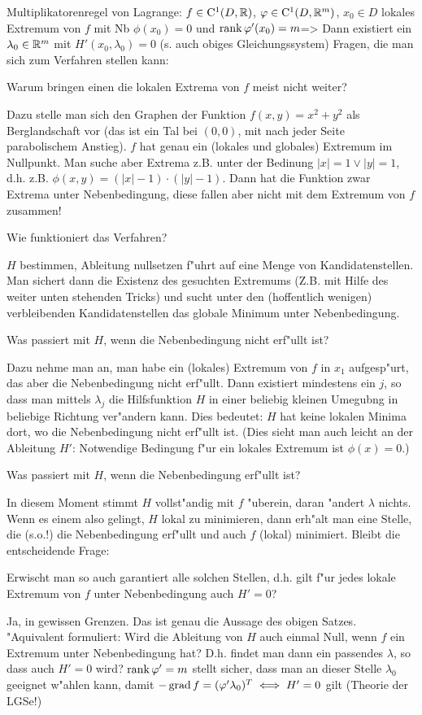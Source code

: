 \theorem Multiplikatorenregel von Lagrange:
  $f\in{\rm C}^1(D,\mathbb R)$, $\varphi\in{\rm C}^1(D,\mathbb R^m)$, 
  $x_0\in D$ lokales Extremum von $f$ mit Nb $\phi(x_0)=0$ und
  $\operatorname{rank} \varphi'(x_0)=m$=>{
  Dann existiert ein $\lambda_0\in\mathbb R^m$ mit $H'(x_0,\lambda_0)=0$ 
  (s. auch obiges Gleichungssystem)
  }
\annotation Fragen, die man sich zum Verfahren stellen kann:{
  Warum bringen einen die lokalen Extrema von $f$ meist nicht weiter?

  Dazu stelle man sich den Graphen der Funktion $f(x,y)=x^2+y^2$ als
  Berglandschaft vor (das ist ein Tal bei $(0,0)$, mit nach jeder
  Seite parabolischem Anstieg). $f$ hat genau ein (lokales und globales)
  Extremum im Nullpunkt. Man suche aber Extrema z.B. unter der Bedinung
  $|x|=1 \lor |y|=1$, d.h. z.B. $\phi(x,y)=(|x|-1)\cdot(|y|-1)$. Dann hat
  die Funktion zwar Extrema unter Nebenbedingung, diese fallen aber
  nicht mit dem Extremum von $f$ zusammen!

  Wie funktioniert das Verfahren?

  $H$ bestimmen, Ableitung nullsetzen f"uhrt auf eine Menge von
  Kandidatenstellen. Man sichert dann die Existenz des gesuchten
  Extremums (Z.B. mit Hilfe des weiter unten stehenden
  Tricks) und sucht unter den (hoffentlich wenigen) verbleibenden
  Kandidatenstellen das globale Minimum unter Nebenbedingung.

  Was passiert mit $H$, wenn die Nebenbedingung nicht erf"ullt ist?

  Dazu nehme man an, man habe ein (lokales) Extremum von $f$ in $x_1$
  aufgesp"urt, das aber die Nebenbedingung nicht erf"ullt.  Dann
  existiert mindestens ein $j$, so dass man mittels $\lambda_j$ die
  Hilfsfunktion $H$ in einer beliebig kleinen Umegubng in beliebige
  Richtung ver"andern kann. Dies bedeutet: $H$ hat keine lokalen
  Minima dort, wo die Nebenbedingung nicht erf"ullt ist.  (Dies sieht
  man auch leicht an der Ableitung $H'$: Notwendige Bedingung f"ur ein
  lokales Extremum ist $\phi(x)=0$.)

  Was passiert mit $H$, wenn die Nebenbedingung erf"ullt ist?

  In diesem Moment stimmt $H$ vollst"andig mit $f$ "uberein, daran
  "andert $\lambda$ nichts. Wenn es einem also gelingt, $H$ lokal zu minimieren,
  dann erh"alt man eine Stelle, die (s.o.!) die Nebenbedingung erf"ullt
  und auch $f$ (lokal) minimiert. Bleibt die entscheidende Frage:

  Erwischt man so auch garantiert alle solchen Stellen, d.h. gilt f"ur jedes
  lokale Extremum von $f$  unter Nebenbedingung auch $H'=0$?

  Ja, in gewissen Grenzen. Das ist genau die Aussage des obigen
  Satzes.  "Aquivalent formuliert: Wird die Ableitung von $H$ auch
  einmal Null, wenn $f$ ein Extremum unter Nebenbedingung hat? 
  D.h. findet man dann ein passendes $\lambda$, so dass auch $H'=0$ wird?
  $\operatorname{rank} \varphi'=m$ stellt sicher, dass man an dieser Stelle $\lambda_0$
  geeignet w"ahlen kann, damit $-\operatorname{grad} f=(\varphi'\lambda_0)^T\iff H'=0$ gilt (Theorie
  der LGSe!)
  }
